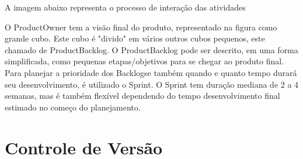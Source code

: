 A imagem abaixo representa o processo de interação das atividades

	\begin{figure}[h!]
		\centering
	\end{figure}
	
O ProductOwner tem a visão final do produto, representado na figura como grande cubo. Este cubo é "divido" em vários outros cubos pequenos, este chamado de ProductBacklog.
O ProductBacklog pode ser descrito, em uma forma simplificada, como pequenas etapas/objetivos para se chegar ao produto final.
Para planejar a prioridade dos Backlogse também quando e quanto tempo durará seu desenvolvimento, é utilizado o Sprint.
O Sprint tem duração mediana de 2 a 4 semanas, mas é também flexível dependendo do tempo desenvolvimento final estimado no começo do planejamento.

	\begin{figure}[h!]
		\centering
	\end{figure}



\section{Controle de Versão}
\label{sec:Controle-de-Versão}